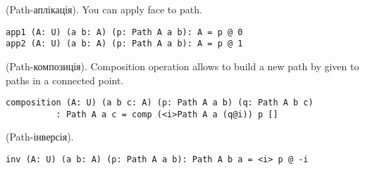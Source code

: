 \begin{definition} (Path-аплікація).
You can apply face to path.
\begin{lstlisting}
app1 (A: U) (a b: A) (p: Path A a b): A = p @ 0
app2 (A: U) (a b: A) (p: Path A a b): A = p @ 1
\end{lstlisting}
\end{definition}

\begin{definition} (Path-композиція).
Composition operation allows to build a new path by given to paths
in a connected point.
\begin{center}
\end{center}
\begin{lstlisting}
composition (A: U) (a b c: A) (p: Path A a b) (q: Path A b c)
          : Path A a c = comp (<i>Path A a (q@i)) p []
\end{lstlisting}
\end{definition}

\begin{theorem} (Path-інверсія).
\begin{lstlisting}
inv (A: U) (a b: A) (p: Path A a b): Path A b a = <i> p @ -i
\end{lstlisting}
\end{theorem}

